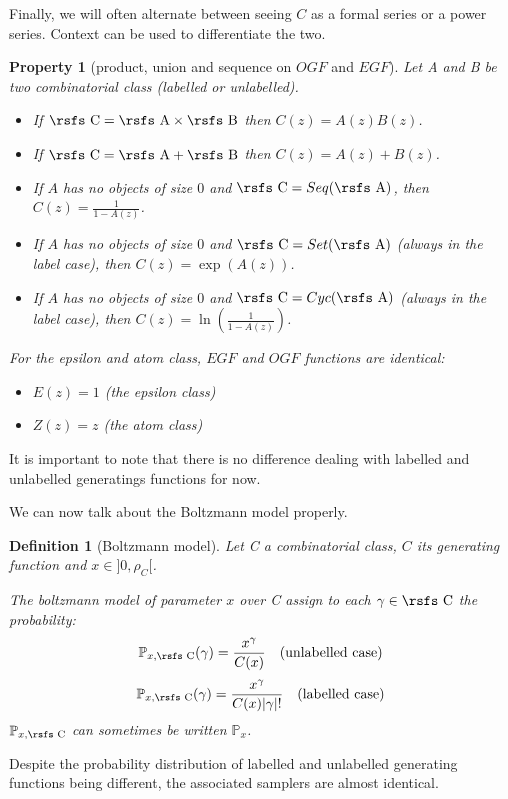 \documentclass{article}
\newtheorem{property}{Property}
\newtheorem{definition}{Definition}
\begin{document}
Finally, we will often alternate between seeing $C$ as a formal series or a power series. Context can be used to differentiate the two.

\begin{property}[product, union and sequence on $OGF$ and $EGF$] \label{pusOGFEGF}
Let {\rsfs A} and {\rsfs B} be two combinatorial class (labelled or unlabelled).

\begin{itemize}
	\item If $\text{\rsfs C} = \text{\rsfs A} \times \text{\rsfs B}$ then $C(z) = A(z)B(z)$.

	\item If $\text{\rsfs C} = \text{\rsfs A} + \text{\rsfs B}$ then $C(z) = A(z) + B(z)$.

	\item If $A$ has no objects of size $0$ and $\text{\rsfs C} = Seq(\text{\rsfs A})$, then $C(z) = \frac{1}{1-A(z)}$.

	\item If $A$ has no objects of size $0$ and $\text{\rsfs C} = Set(\text{\rsfs A})$ (always in the label case), then $C(z) = \exp(A(z))$.

 	\item If $A$ has no objects of size $0$ and $\text{\rsfs C} = Cyc(\text{\rsfs A})$ (always in the label case), then $C(z) = \ln(\frac{1}{1-A(z)})$.
\end{itemize}

For the epsilon and atom class, $EGF$ and $OGF$ functions are identical:
\begin{itemize}
	\item $E(z) = 1$ (the epsilon class)
	\item $Z(z) = z$ (the atom class)
\end{itemize}
\end{property}

It is important to note that there is no difference dealing with labelled and unlabelled generatings functions for now.

We can now talk about the Boltzmann model properly.
\begin{definition}[Boltzmann model]
Let {\rsfs C} a combinatorial class, $C$ its generating function and $x \in ]0,\rho_C[$.

The boltzmann model of parameter $x$ over {\rsfs C} assign to each $\gamma \in \text{\rsfs C}$ the probability:
$$\mathbb{P}_{x,\text{\rsfs C}}(\gamma) = \frac{x^{\gamma}}{C(x)} \text{   (unlabelled case)}$$
$$\mathbb{P}_{x,\text{\rsfs C}}(\gamma) = \frac{x^{\gamma}}{C(x)|\gamma|!} \text{   (labelled case)}$$
$\mathbb{P}_{x,\text{\rsfs C}}$ can sometimes be written $\mathbb{P}_{x}$.
\end{definition}
Despite the probability distribution of labelled and unlabelled generating functions being different, the associated samplers are almost identical.
\end{document}
